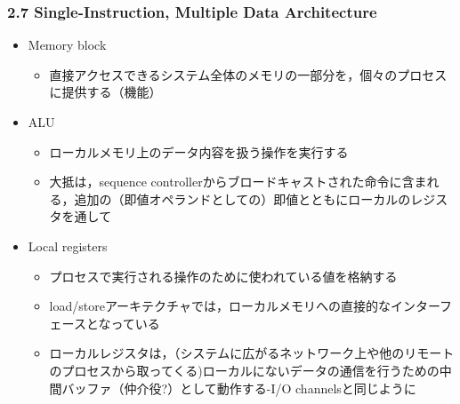 \documentclass[12pt, unicode, dvipdfmx]{beamer}
\begin{document}
\begin{frame}[t]
	\frametitle{2.7 Single-Instruction, Multiple Data Architecture}
	\begin{itemize}
		\item Memory block
		\begin{itemize}
			\item 直接アクセスできるシステム全体のメモリの一部分を，個々のプロセスに提供する（機能）
		\end{itemize}

		\item ALU
		\begin{itemize}
			\item ローカルメモリ上のデータ内容を扱う操作を実行する
			\item 大抵は，sequence controllerからブロードキャストされた命令に含まれる，追加の（即値オペランドとしての）即値とともにローカルのレジスタを通して
		\end{itemize}
		
	\item Local registers
		\begin{itemize}
			\item プロセスで実行される操作のために使われている値を格納する
			\item load/storeアーキテクチャでは，ローカルメモリへの直接的なインターフェースとなっている
			\item ローカルレジスタは，（システムに広がるネットワーク上や他のリモートのプロセスから取ってくる)ローカルにないデータの通信を行うための中間バッファ（仲介役?）として動作する-I/O channelsと同じように
		\end{itemize}
	\end{itemize}
\end{frame}
\end{document}
